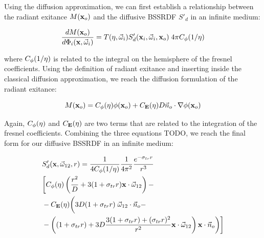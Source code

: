 Using the diffusion approximation, we can first establish a relationship between the radiant exitance $M(\mathbf{x}_o)$ and the diffusive BSSRDF $S'_d$ in an infinite medium:

$$
\frac{d M(\mathbf{x}_o)}{d \Phi_i(\mathbf{x}, \vec{\omega}_i)} = T(\eta, \vec{\omega}_i) S'_d(\mathbf{x}_i, \vec{\omega}_i, \mathbf{x}_o) \; 4\pi C_{\phi}(1/\eta) 
$$

where $C_{\phi}(1/\eta)$ is related to the integral on the hemisphere of the fresnel coefficients. Using the definition of radiant exitance and inserting inside the classical diffusion approximation, we reach the diffusion formulation of the radiant exitance:

$$
M(\mathbf{x}_o) = C_{\phi}(\eta) \phi(\mathbf{x}_o) + C_{\mathbf{E}}(\eta) D \vec{n}_o \cdot \nabla \phi(\mathbf{x}_o)
$$

Again, $C_{\phi}(\eta)$ and $C_{\mathbf{E}}(\eta)$ are two terms that are related to the integration of the fresnel coefficients. Combining the three equations TODO, we reach the final form for our diffusive BSSRDF in an infinite medium:

\begin{equation}
\begin{split}
&S'_d(\mathbf{x}, \vec{\omega}_{12}, r) = \frac{1}{4C_{\phi}(1/\eta)} \frac{1}{4\pi^2} \frac{e^{-\sigma_{tr} r}}{r^3} \\
&\bigg[ C_{\phi}(\eta) \left(\frac{r^2}{D} + 3 (1 + \sigma_{tr} r ) \mathbf{x} \cdot \vec{\omega}_{12} \right) - \\
&-C_{\mathbf{E}}(\eta) \bigg(3D (1 + \sigma_{tr} r) \; \vec{\omega}_{12} \cdot \vec{n}_o - \\ 
&-\left( (1 + \sigma_{tr} r) + 3D \frac{3(1 + \sigma_{tr} r ) + (\sigma_{tr} r)^2}{r^2}  \mathbf{x} \cdot \vec{\omega}_{12} \right)  \mathbf{x} \cdot \vec{n}_o \bigg) \bigg] 
\end{split}
\end{equation}

